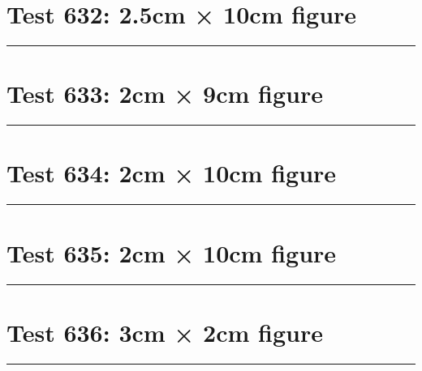 \documentclass[a4paper,11pt]{article}
\begin{document}
\section*{Test 632: 2.5cm × 10cm figure}
\begin{swarmwrap}%
  \begin{minipage}[t]{2cm}
    \centering
    \rule{\linewidth}{10cm}
  \end{minipage}%
\end{swarmwrap}%
\swarmwrapnext
\lipsum[97]
\lipsum[98]
\lipsum[99]
\lipsum[100]
\lipsum[101]
\lipsum[102]
\section*{Test 633: 2cm × 9cm figure}
\begin{swarmwrap}%
  \begin{minipage}[t]{2cm}
    \centering
    \rule{\linewidth}{9cm}
  \end{minipage}%
\end{swarmwrap}%
\swarmwrapnext
\lipsum[6]
\lipsum[7]
\lipsum[8]
\lipsum[9]
\lipsum[10]
\lipsum[11]
\section*{Test 634: 2cm × 10cm figure}
\begin{swarmwrap}%
  \begin{minipage}[t]{2cm}
    \centering
    \rule{\linewidth}{10cm}
  \end{minipage}%
\end{swarmwrap}%
\swarmwrapnext
\lipsum[5]
\lipsum[6]
\lipsum[7]
\lipsum[8]
\lipsum[9]
\lipsum[10]
\section*{Test 635: 2cm × 10cm figure}
\begin{swarmwrap}%
  \begin{minipage}[t]{2cm}
    \centering
    \rule{\linewidth}{10cm}
  \end{minipage}%
\end{swarmwrap}%
\swarmwrapnext
\lipsum[139]
\lipsum[140]
\lipsum[141]
\lipsum[142]
\lipsum[143]
\section*{Test 636: 3cm × 2cm figure}
\begin{swarmwrap}%
  \begin{minipage}[t]{3cm}
    \centering
    \rule{\linewidth}{2cm}
  \end{minipage}%
\end{swarmwrap}%
\swarmwrapnext
\lipsum[47]
\lipsum[48]
\lipsum[49]
\lipsum[50]
\lipsum[51]
\lipsum[52]
\end{document}
